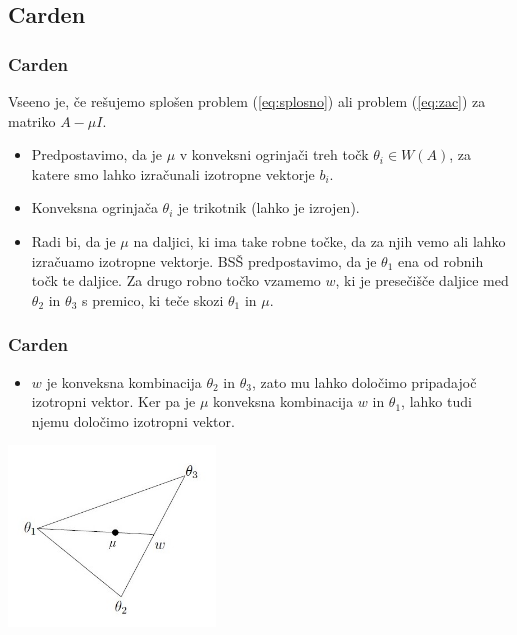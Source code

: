 \documentclass{beamer}
\begin{document}
\subsection{Carden}
\begin{frame}
\frametitle{Carden}
Vseeno je, če rešujemo splošen problem (\ref{eq:splosno}) ali problem (\ref{eq:zac}) za matriko $A-\mu I$.\pause
\begin{itemize}
\item Predpostavimo, da je $\mu$ v konveksni ogrinjači treh točk $\theta_i \in W(A)$, za katere smo lahko izračunali izotropne vektorje $b_i$. 
\item Konveksna ogrinjača $\theta_i$ je trikotnik (lahko je izrojen).
\item Radi bi, da je $\mu$ na daljici, ki ima take robne točke, da za njih vemo ali lahko izračuamo izotropne vektorje. BSŠ predpostavimo, da je $\theta_1$ ena od robnih točk te daljice. Za drugo robno točko vzamemo $w$, ki je presečišče daljice med $\theta_2$ in $\theta_3$ s premico, ki teče skozi $\theta_1$ in $\mu$.
\end{itemize}
\end{frame}
\begin{frame}
\frametitle{Carden}
\begin{itemize}
\item $w$ je konveksna kombinacija $\theta_2$ in $\theta_3$, zato mu lahko določimo pripadajoč izotropni vektor. Ker pa je $\mu$ konveksna kombinacija $w$ in $\theta_1$, lahko tudi njemu določimo izotropni vektor.
\end{itemize}
\begin{center}
\includegraphics[width=5.5cm]{triangle.jpg}
\end{center}
\end{frame}
\end{document}
